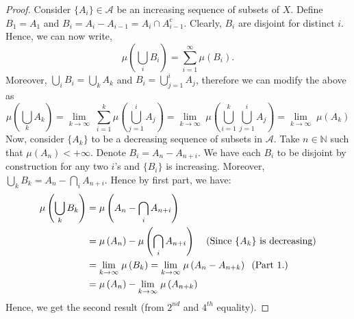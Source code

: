 \documentclass{article}
\theoremstyle{definition}
\theoremstyle{remark}
\theoremstyle{definition}
\theoremstyle{definition}
\theoremstyle{definition}
\newcommand{\intrs}{\cap}
\newcommand{\bunion}{\bigcup}
\newcommand{\bintrs}{\bigcap}
\newcommand{\N}{\mathbb{N}}
\newcommand{\alg}[1]{\mathscr{#1}}
\newcommand{\comp}[1]{#1^{\text{c}}}
\newcommand{\m}[1]{\mu\left (#1\right )}
\newcommand{\limit}[2]{\underset{#1}{\lim}\; #2}
\begin{document}
\begin{proof}
	Consider $ \{A_i\} \in \alg{A} $ be an increasing sequence of subsets of $ X $. Define $ B_1 = A_1 $ and $ B_i = A_i - A_{i-1} = A_i \intrs \comp{A_{i-1}}$. Clearly, $ B_i $ are disjoint for distinct $ i $. Hence, we can now write,
	\[\m{\bunion_i B_i} =\sum_{i=1}^\infty \m{B_i}.\]
	Moreover, $ \bunion_i B_i = \bunion_k A_k $ and $ B_i = \bunion_{j=1}^i A_j $, therefore we can modify the above as
	\[\m{\bunion_k A_k} = \limit{k\to \infty}{\sum_{i=1}^k \m{\bunion_{j=1}^i A_j}}= \limit{k\to\infty }{\m{\bunion_{i=1}^k \bunion_{j=1}^i A_j}} = \limit{k\to \infty }{\m{A_k}}\]
	Now, consider $ \{A_k\} $ to be a decreasing sequence of subsets in $ \alg{A} $. Take $ n\in \N $ such that $ \m{A_n} < + \infty$. Denote $ B_i = A_n - A_{n+i} $. We have each $ B_i $ to be disjoint by construction for any two $ i $'s and $ \{B_i\} $ is increasing. Moreover, $ \bunion_k B_k = A_n - \bintrs_{i}A_{n+i}$. Hence by first part, we have:
	\begin{equation*}
		\begin{split}
			\m{\bunion_{k}B_k} &= \m{A_n - \bintrs_i A_{n+i}}\\
			&= \m{A_n} - \m{\bintrs_i A_{n+i}}\;\;\;\;\text{(Since $ \{A_k\} $ is decreasing)}\\
			&= \limit{k\to \infty}{\m{B_k}} = \limit{k\to \infty}{\m{A_n - A_{n+k}}}\;\;\text{(Part 1.)}\\
			&= \m{A_n} - \limit{k\to\infty}{\m{A_{n+k}}}
		\end{split}
	\end{equation*} 
Hence, we get the second result (from $ 2^{nd} $ and $ 4^{th} $ equality).
\end{proof}
\hrulefill
\end{document}
